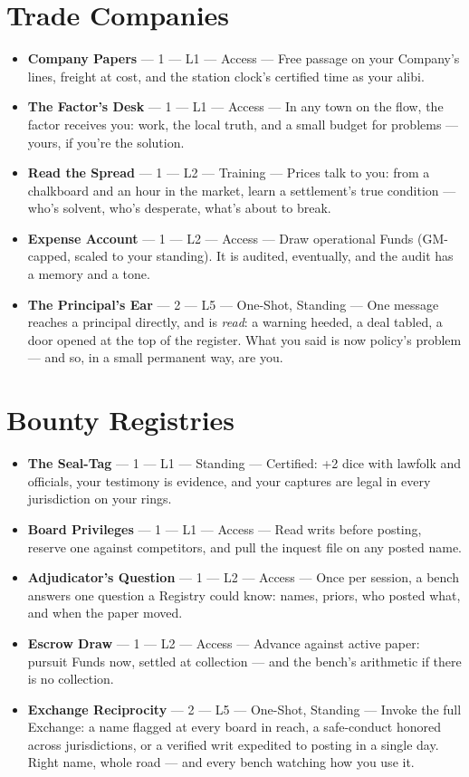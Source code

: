 \section{Trade Companies}

\begin{itemize}
    \item \textbf{Company Papers} --- 1 --- L1 --- Access --- Free passage on your Company's lines, freight at cost, and the station clock's certified time as your alibi.
    \item \textbf{The Factor's Desk} --- 1 --- L1 --- Access --- In any town on the flow, the factor receives you: work, the local truth, and a small budget for problems --- yours, if you're the solution.
    \item \textbf{Read the Spread} --- 1 --- L2 --- Training --- Prices talk to you: from a chalkboard and an hour in the market, learn a settlement's true condition --- who's solvent, who's desperate, what's about to break.
    \item \textbf{Expense Account} --- 1 --- L2 --- Access --- Draw operational Funds (GM-capped, scaled to your standing). It is audited, eventually, and the audit has a memory and a tone.
    \item \textbf{The Principal's Ear} --- 2 --- L5 --- One-Shot, Standing --- One message reaches a principal directly, and is \textit{read}: a warning heeded, a deal tabled, a door opened at the top of the register. What you said is now policy's problem --- and so, in a small permanent way, are you.
\end{itemize}

\section{Bounty Registries}

\begin{itemize}
    \item \textbf{The Seal-Tag} --- 1 --- L1 --- Standing --- Certified: +2 dice with lawfolk and officials, your testimony is evidence, and your captures are legal in every jurisdiction on your rings.
    \item \textbf{Board Privileges} --- 1 --- L1 --- Access --- Read writs before posting, reserve one against competitors, and pull the inquest file on any posted name.
    \item \textbf{Adjudicator's Question} --- 1 --- L2 --- Access --- Once per session, a bench answers one question a Registry could know: names, priors, who posted what, and when the paper moved.
    \item \textbf{Escrow Draw} --- 1 --- L2 --- Access --- Advance against active paper: pursuit Funds now, settled at collection --- and the bench's arithmetic if there is no collection.
    \item \textbf{Exchange Reciprocity} --- 2 --- L5 --- One-Shot, Standing --- Invoke the full Exchange: a name flagged at every board in reach, a safe-conduct honored across jurisdictions, or a verified writ expedited to posting in a single day. Right name, whole road --- and every bench watching how you use it.
\end{itemize}

